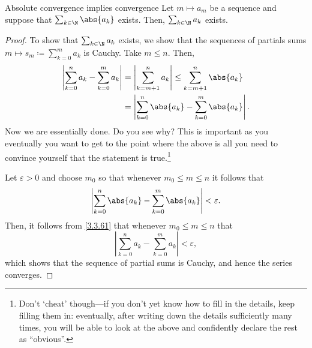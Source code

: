 \begin{prp}{Absolute convergence implies convergence}{}
Let $m\mapsto a_m$ be a sequence and suppose that $\sum _{k\in \N}\abs{a_k}$ exists.  Then, $\sum _{k\in \N}a_k$ exists.
\begin{proof}
To show that $\sum _{k\in \N}a_k$ exists, we show that the sequences of partials sums $m\mapsto s_m\coloneqq \sum _{k=0}^ma_k$ is Cauchy.  Take $m\leq n$.  Then,
\begin{equation}\label{3.3.61}
\begin{split}
\left| \sum _{k=0}^na_k-\sum _{k=0}^ma_k\right| & =\left| \sum _{k=m+1}^na_k\right| \leq \sum _{k=m+1}^n\abs{a_k} \\
& =\left| \sum _{k=0}^n\abs{a_k}-\sum _{k=0}^m\abs{a_k}\right| .
\end{split}
\end{equation}
Now we are essentially done.  Do you see why?  This is important as you eventually you want to get to the point where the above is all you need to convince yourself that the statement is true.\footnote{Don't `cheat' though---if you don't yet know how to fill in the details, keep filling them in:  eventually, after writing down the details sufficiently many times, you will be able to look at the above and confidently declare the rest as ``obvious''.}

Let $\varepsilon >0$ and choose $m_0$ so that whenever $m_0\leq m\leq n$ it follows that
\begin{equation}
\left| \sum _{k=0}^n\abs{a_k}-\sum _{k=0}^m\abs{a_k}\right| <\varepsilon .
\end{equation}
Then, it follows from \eqref{3.3.61} that whenever $m_0\leq m\leq n$ that
\begin{equation}
\left| \sum _{k=0}^na_k-\sum _{k=0}^ma_k\right| <\varepsilon ,
\end{equation}
which shows that the sequence of partial sums is Cauchy, and hence the series converges.
\end{proof}
\end{prp}

